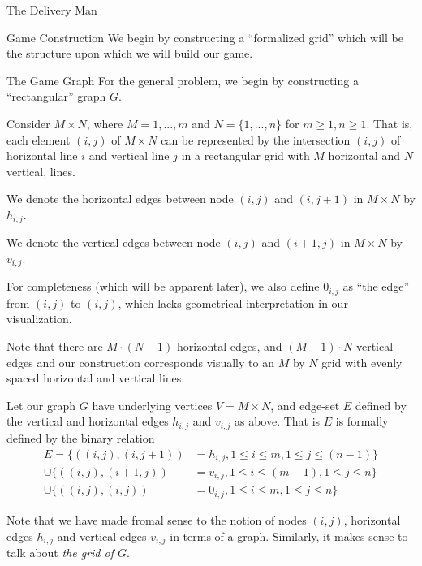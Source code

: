 \begin{section}{The Delivery Man}
  \begin{subsection}{Game Construction}
    We begin by constructing a ``formalized grid'' which will be the structure upon which we will build our game. 
    
    \begin{subsubsection}{The Game Graph}
    For the general problem, we begin by constructing a ``rectangular'' graph $G$. 

    Consider $M\times N$, where $M = {1, ..., m}$ and $N = \{1, ..., n\}$ for $m \geq 1, n \geq 1$. That is, each element $(i, j)$ of $M\times N$ can be represented by the intersection $(i, j)$ of horizontal line $i$ and vertical line $j$ in a rectangular grid with $M$ horizontal and $N$ vertical, lines.

    We denote the horizontal edges between node $(i, j)$ and $(i, j+1)$ in $M \times N$ by $h_{i,j}$.

    We denote the vertical edges between node $(i, j)$ and $(i+1, j)$ in $M \times N$ by $v_{i,j}$.

    For completeness (which will be apparent later), we also define $0_{i,j}$ as ``the edge'' from $(i,j)$ to $(i,j)$, which lacks geometrical interpretation in our visualization.

    Note that there are $M\cdot (N-1)$ horizontal edges, and $(M-1)\cdot N$ vertical edges and our construction corresponds visually to an $M$ by $N$ grid with evenly spaced horizontal and vertical lines.

    Let our graph $G$ have underlying vertices $V = M \times N$, and edge-set $E$ defined by the vertical and horizontal edges $h_{i,j}$ and $v_{i,j}$ as above. That is $E$ is formally defined by the binary relation
    \begin{equation}
      \begin{split}
      E = \{((i, j), (i, j+1)) &= h_{i,j}, 1 \leq i \leq m, 1 \leq j \leq (n-1)\}
      \\ \cup \{((i, j), (i+1, j)) &= v_{i,j}, 1 \leq i \leq (m-1), 1 \leq j \leq n \}
      \\ \cup \{((i, j), (i, j)) &= 0_{i,j}, 1 \leq i \leq m, 1 \leq j \leq n \}
      \end{split}
    \end{equation}

    Note that we have made fromal sense to the notion of nodes $(i, j)$, horizontal edges $h_{i,j}$ and vertical edges $v_{i,j}$ in terms of a graph. Similarly, it makes sense to talk about \textit{the grid of $G$}.


\end{subsubsection}
\end{subsection}
\end{section}
